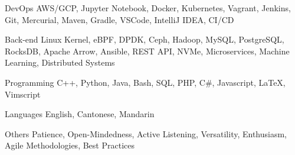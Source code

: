 

\begin{cvskills}

  \cvskill
    {DevOps} %
    {AWS/GCP, Jupyter Notebook, Docker, Kubernetes, Vagrant, Jenkins, Git, Mercurial, Maven, Gradle, VSCode, IntelliJ IDEA, CI/CD} %

  \cvskill
    {Back-end} %
    {Linux Kernel, eBPF, DPDK, Ceph, Hadoop, MySQL, PostgreSQL, RocksDB, Apache Arrow, Ansible, REST API, NVMe, Microservices, Machine Learning, Distributed Systems} %

  \cvskill
    {Programming} %
    {C++, Python, Java, Bash, SQL, PHP, C\#, Javascript, LaTeX, Vimscript} %

  \cvskill
    {Languages} %
    {English, Cantonese, Mandarin} %

  \cvskill
    {Others} %
    {Patience, Open-Mindedness, Active Listening, Versatility, Enthusiasm, Agile Methodologies, Best Practices} %

\end{cvskills}
